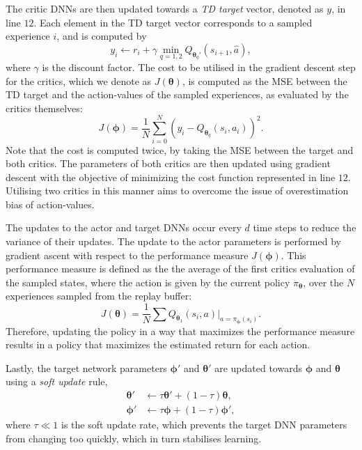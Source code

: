 The critic DNNs are then updated towards a \emph{TD target} vector, denoted as $y$, in line $12$.
Each element in the TD target vector corresponds to a sampled experience $i$, and is computed by
\begin{equation}
    y_i \leftarrow r_i + \gamma \min_{q=1,2} Q_{\bm{\theta}_q'}(s_{i+1}, \hat{a}),
\end{equation}
where $\gamma$ is the discount factor. The cost to be utilised in the gradient descent step for the critics, which we denote as $J(\bm{\theta})$, is computed as the MSE between the TD target and the action-values of the sampled experiences, as evaluated by the critics themselves:
\begin{equation}
     J(\bm{\phi}) = \frac{1}{N} \sum_{i=0}^{N} (y_i - Q_{\bm{\theta}_q}(s_i,a_i))^{2}.
\end{equation}
Note that the cost is computed twice, by taking the MSE between the target and both critics.
The parameters of both critics are then updated using gradient descent with the objective of minimizing the cost function represented in line $12$.
Utilising two critics in this manner aims to overcome the issue of overestimation bias of action-values.


The updates to the actor and target DNNs occur every $d$ time steps to reduce the variance of their updates. 
The update to the actor parameters is performed by gradient ascent with respect to the performance measure $J(\bm{\phi})$.
This performance measure is defined as the the average of the first critics evaluation of the sampled states, where the action is given by the current policy $\pi_{\bm{\theta}}$, over the $N$ experiences sampled from the replay buffer:
\begin{equation}
    J(\bm{\theta}) = \frac{1}{N} \sum Q_{\bm{\theta}_1}(s_i,a) | _{a=\pi_{\bm{\phi}}(s_i)}.
\end{equation}
Therefore, updating the policy in a way that maximizes the performance measure results in a policy that maximizes the estimated return for each action.


Lastly, the target network parameters $\bm{\phi}'$ and $\bm{\theta}'$ are updated towards $\bm{\phi}$ and $\bm{\theta}$ using a \emph{soft update} rule, 
\begin{equation}
\begin{split}
    \bm{\theta}' &\leftarrow \tau \bm{\theta}' + (1 - \tau) \bm{\theta}, \\
    \bm{\phi}' &\leftarrow \tau \bm{\phi} + (1 - \tau) \bm{\phi}',
\end{split}
\end{equation}
where $\tau \ll 1$ is the soft update rate, which prevents the target DNN parameters from changing too quickly, which in turn stabilises learning. 





